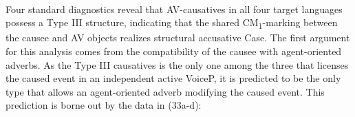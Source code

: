 \documentclass[10pt]{article}
\begin{document}
 \begin{exe}
 \\
 \end{exe}

\smallskip


Four standard diagnostics reveal that AV-causatives in all four target languages possess a Type III structure, indicating that the shared CM\textsubscript{1}-marking between the causee and AV objects realizes structural accusative Case. The first argument for this analysis comes from the compatibility of the causee with agent-oriented adverbs. As the Type III causatives is the only one among the three that licenses the caused event in an independent active VoiceP, it is predicted to be the only type that allows an agent-oriented adverb modifying the caused event. This prediction is borne out by the data in (33a-d):
\end{document}
